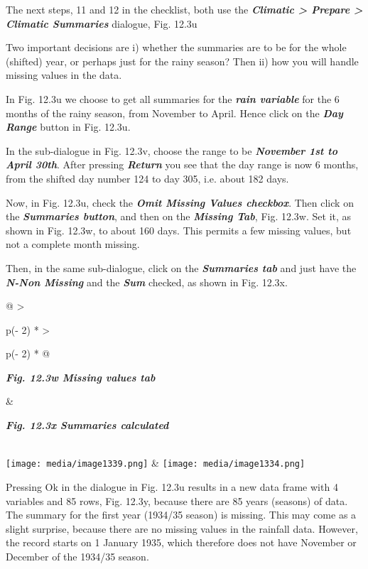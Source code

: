 \documentclass[
  letterpaper,
  DIV=11,
  numbers=noendperiod]{scrreprt}
\begin{document}
The next steps, 11 and 12 in the checklist, both use the
\textbf{\emph{Climatic \textgreater{} Prepare \textgreater{} Climatic
Summaries}} dialogue, Fig. 12.3u

Two important decisions are i) whether the summaries are to be for the
whole (shifted) year, or perhaps just for the rainy season? Then ii) how
you will handle missing values in the data.

In Fig. 12.3u we choose to get all summaries for the \textbf{\emph{rain
variable}} for the 6 months of the rainy season, from November to April.
Hence click on the \textbf{\emph{Day Range}} button in Fig. 12.3u.

In the sub-dialogue in Fig. 12.3v, choose the range to be
\textbf{\emph{November 1st to April 30th}}. After pressing
\textbf{\emph{Return}} you see that the day range is now 6 months, from
the shifted day number 124 to day 305, i.e. about 182 days.

Now, in Fig. 12.3u, check the \textbf{\emph{Omit Missing Values
checkbox}}. Then click on the \textbf{\emph{Summaries button}}, and then
on the \textbf{\emph{Missing Tab}}, Fig. 12.3w. Set it, as shown in Fig.
12.3w, to about 160 days. This permits a few missing values, but not a
complete month missing.

Then, in the same sub-dialogue, click on the \textbf{\emph{Summaries
tab}} and just have the \textbf{\emph{N-Non Missing}} and the
\textbf{\emph{Sum}} checked, as shown in Fig. 12.3x.

\begin{longtable}[]{@{}
  >{\raggedright\arraybackslash}p{(\columnwidth - 2\tabcolsep) * }
  >{\raggedright\arraybackslash}p{(\columnwidth - 2\tabcolsep) * }@{}}
\toprule\noalign{}
\begin{minipage}[b]{\linewidth}\raggedright
\textbf{\emph{Fig. 12.3w Missing values tab}}
\end{minipage} & \begin{minipage}[b]{\linewidth}\raggedright
\textbf{\emph{Fig. 12.3x Summaries calculated}}
\end{minipage} \\
\midrule\noalign{}
\endhead
\bottomrule\noalign{}
\endlastfoot
\texttt{[image: media/image1339.png]}
&
\texttt{[image: media/image1334.png]} \\
\end{longtable}

Pressing Ok in the dialogue in Fig. 12.3u results in a new data frame
with 4 variables and 85 rows, Fig. 12.3y, because there are 85 years
(seasons) of data. The summary for the first year (1934/35 season) is
missing. This may come as a slight surprise, because there are no
missing values in the rainfall data. However, the record starts on 1
January 1935, which therefore does not have November or December of the
1934/35 season.
\end{document}
